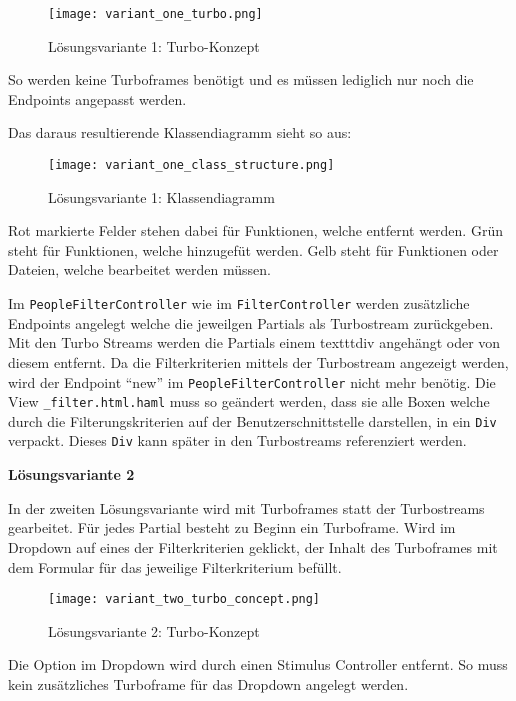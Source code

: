 \begin{figure}[h]
   \centering
   \texttt{[image: variant\_one\_turbo.png]}
   \caption{Lösungsvariante 1: Turbo-Konzept}
\end{figure}

So werden keine Turboframes benötigt und es müssen lediglich nur noch die Endpoints angepasst werden.

\newpage

Das daraus resultierende Klassendiagramm sieht so aus:

\begin{figure}[h]
   \centering
   \texttt{[image: variant\_one\_class\_structure.png]}
   \caption{Lösungsvariante 1: Klassendiagramm}
\end{figure}

Rot markierte Felder stehen dabei für Funktionen, welche entfernt werden. Grün steht für Funktionen, welche hinzugefüt werden.
Gelb steht für Funktionen oder Dateien, welche bearbeitet werden müssen.

Im \texttt{PeopleFilterController} wie im \texttt{FilterController} werden zusätzliche Endpoints angelegt
welche die jeweilgen Partials als Turbostream zurückgeben. Mit den Turbo Streams werden die Partials einem texttt{div} angehängt oder
von diesem entfernt. Da die Filterkriterien mittels der Turbostream angezeigt werden, wird der Endpoint ``new'' im \texttt{PeopleFilterController}
nicht mehr benötig. Die View \texttt{\_filter.html.haml} muss so geändert werden, dass sie alle Boxen welche durch die Filterungskriterien
auf der Benutzerschnittstelle darstellen, in ein \texttt{Div} verpackt. Dieses \texttt{Div} kann später in den 
Turbostreams referenziert werden.

\newpage

\textbf{Lösungsvariante 2}

In der zweiten Lösungsvariante wird mit Turboframes statt der Turbostreams gearbeitet. Für jedes Partial besteht zu Beginn ein
Turboframe. Wird im Dropdown auf eines der Filterkriterien geklickt, der Inhalt des Turboframes mit dem Formular für das jeweilige 
Filterkriterium befüllt.

\begin{figure}[h]
   \centering
   \texttt{[image: variant\_two\_turbo\_concept.png]}
   \caption{Lösungsvariante 2: Turbo-Konzept}
\end{figure}

Die Option im Dropdown wird durch einen Stimulus Controller entfernt. So muss kein zusätzliches 
Turboframe für das Dropdown angelegt werden. 


